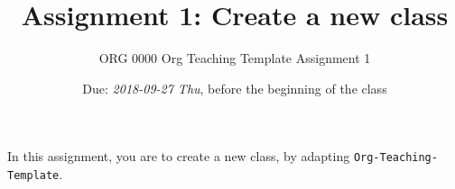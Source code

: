 \documentclass[10pt,article]{article}
\author{ORG 0000 Org Teaching Template Assignment 1}
\date{Due: \textit{2018-09-27 Thu}, before the beginning of the class}
\title{Assignment 1: Create a new class}
\begin{document}
\maketitle
In this assignment, you are to create a new class, by adapting \texttt{Org-Teaching-Template}.
\end{document}
